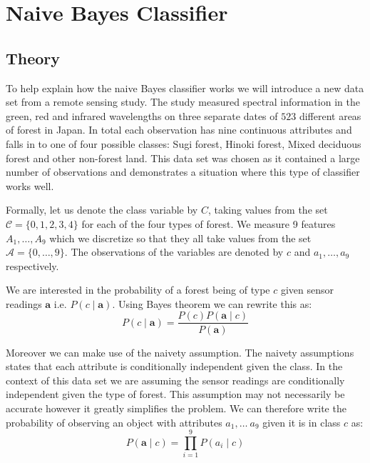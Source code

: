 \chapter{Naive Bayes Classifier}

\section{Theory}

To help explain how the naive Bayes classifier works we will introduce a new data set from a remote sensing study.
The study measured spectral information in the green, red and infrared wavelengths on three separate dates of $523$ different areas of forest in Japan.
In total each observation has nine continuous attributes and falls in to one of four possible classes: Sugi forest, Hinoki forest, Mixed deciduous forest and other non-forest land.
This data set was chosen as it contained a large number of observations and demonstrates a situation where this type of classifier works well.

Formally, let us denote the class variable by $C$, taking values from the set $\mathcal{C} = \{0,1,2,3,4\}$ for each of the four types of forest.
We measure 9 features $A_1,\dots,A_9$ which we discretize so that they all take values from the set $\mathcal{A} = \{0,\dots,9\}$.
The observations of the variables are denoted by $c$ and $a_1,\dots,a_9$ respectively.

We are interested in the probability of a forest being of type $c$ given sensor readings $\mathbf{a}$ i.e. $P(c \mid \mathbf{a})$.
Using Bayes theorem we can rewrite this as:
\begin{equation} \label{bayes}
	P(c \mid \mathbf{a}) = \frac{P(c)P(\mathbf{a} \mid c)}{P(\mathbf{a})}
\end{equation}

Moreover we can make use of the naivety assumption.
The naivety assumptions states that each attribute is conditionally independent given the class.
In the context of this data set we are assuming the sensor readings are conditionally independent given the type of forest.
This assumption may not necessarily be accurate however it greatly simplifies the problem.
We can therefore write the probability of observing an object with attributes $a_1, \dots\ a_9$ given it is in class $c$ as:
\begin{equation} \label{naivety}
	P(\mathbf{a} \mid c) = \prod_{i=1}^9 P(a_i \mid c)
\end{equation}

